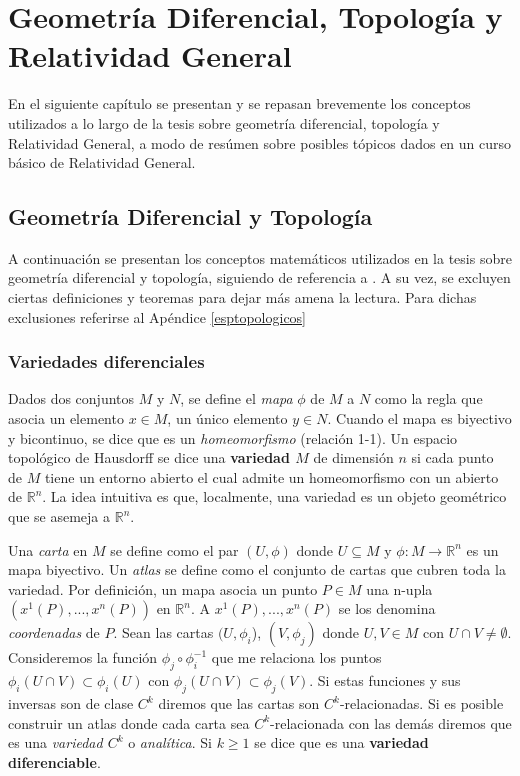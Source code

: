 ﻿\chapter{Geometría Diferencial, Topología y Relatividad General}\label{geo dif}



En el siguiente capítulo se presentan y se repasan brevemente los conceptos utilizados a lo largo de la tesis sobre geometría diferencial, topología y Relatividad General, a modo de resúmen sobre posibles tópicos dados en un curso básico de Relatividad General.





\section{Geometría Diferencial y Topología}

A continuación se presentan los conceptos matemáticos utilizados en la tesis sobre geometría diferencial y topología, siguiendo de referencia a \citep{1984ucp..book.....W,1980gmmp.book.....S}. A su vez, se excluyen ciertas definiciones y teoremas para dejar más amena la lectura. Para dichas exclusiones referirse al Apéndice \ref{esptopologicos}





    
\subsection{Variedades diferenciales}%

Dados dos conjuntos $M$ y $N$, se define el \textit{mapa} $\phi$ de $M$ a $N$ como la regla que asocia un elemento $x\in M$, un único elemento $y\in N$. Cuando el mapa es biyectivo y bicontinuo, se dice que es un \textit{homeomorfismo} (relación 1-1). Un espacio topológico de Hausdorff se dice una \textbf{variedad $M$} de dimensión $n$ si cada punto de $M$ tiene un entorno abierto el cual admite un homeomorfismo con un abierto de $\mathbb{R}^n$. La idea intuitiva es que, localmente, una variedad es un objeto geométrico que se asemeja a $\mathbb{R}^n$.

Una \textit{carta} en $M$ se define como el par $(U,\phi)$ donde $U\subseteq M$ y $\phi:M\rightarrow \mathbb{R}^n$ es un mapa biyectivo. Un \textit{atlas} se define como el conjunto de cartas que cubren toda la variedad. Por definición, un mapa asocia un punto $P\in M$ una n-upla $(x^1(P),...,x^n(P))$ en $\mathbb{R}^n$. A $x^1(P),...,x^n(P)$ se los denomina \textit{coordenadas} de $P$. Sean las cartas $(U,\phi_i$), $(V,\phi_j)$ donde $U, V\in M$ con $U\cap V\neq \emptyset$. Consideremos la función $\phi_j\circ\phi_i^{-1}$ que me relaciona los puntos $\phi_i(U\cap V)\subset\phi_i(U)$ con $\phi_j(U\cap V)\subset\phi_j(V)$. Si estas funciones y sus inversas son de clase $C^k$ diremos que las cartas son $C^k$-relacionadas. Si es posible construir un atlas donde cada carta sea $C^k$-relacionada con las demás diremos que es una \textit{variedad $C^k$} o \textit{analítica}. Si $k\geq1$ se dice que es una \textbf{variedad diferenciable}.


